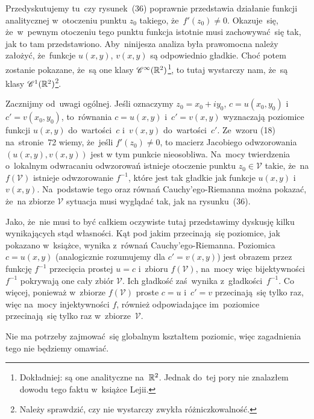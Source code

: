 \documentclass[a4paper,11pt]{article}
\begin{document}
\vspace{\spaceFour}


\start {} Przedyskutujemy tu~czy rysunek~(36) poprawnie
przedstawia działanie funkcji analitycznej w~otoczeniu punktu
$z_{ 0 }$ takiego, że~$f'( z_{ 0 } ) \neq 0$. Okazuje~się, że~w~pewnym
otoczeniu tego punktu funkcja istotnie musi zachowywać~się tak, jak to
tam przedstawiono. Aby~ninijesza analiza była prawomocna należy
założyć, że~funkcje $u( x, y )$, $v( x, y )$ są odpowiednio gładkie.
Choć potem zostanie pokazane, że~są one klasy
$\mathcal{C}^{ \infty }( \mathbb{R}^{ 2 } )$\footnote{Dokładniej: są one analityczne na~$\mathbb{R}^{ 2 }$.
  Jednak do~tej pory nie znalazłem dowodu tego faktu w~książce
  Lejii.}, to tutaj wystarczy nam, że~są klasy
$\mathcal{C}^{ 1 }( \mathbb{R}^{ 2 } )$\footnote{Należy sprawdzić, czy nie wystarczy zwykła
  różniczkowalność.}.

Zacznijmy od~uwagi ogólnej. Jeśli oznaczymy
$z_{ 0 } = x_{ 0 } + i y_{ 0 }$, $c = u( x_{ 0 }, y_{ 0 } )$
i~$c' = v( x_{ 0 }, y_{ 0 } )$, to~równania $c = u( x, y )$
i~$c' = v( x, y )$ wyznaczają poziomice funkcji $u( x, y )$
do~wartości~$c$ i~$v( x, y )$ do~wartości~$c'$. Ze~wzoru (18)
na~stronie~72 wiemy, że~jeśli $f'( z_{ 0 } ) \neq 0$, to macierz
Jacobiego odwzorowania $( u( x, y ), v( x, y ) )$ jest w tym punkcie
nieosobliwa. Na~mocy twierdzenia o~lokalnym odwracaniu odwzorowań
istnieje otoczenie punktu $z_{ 0 } \in \mathcal{V}$ takie, że~na
$f( \mathcal{V} )$ istnieje odwzorowanie $f^{ -1 }$, które jest tak
gładkie jak funkcje $u( x, y )$ i~$v( x, y )$. Na~podstawie tego oraz
równań Cauchy'ego-Riemanna można pokazać, że~na zbiorze $\mathcal{V}$
sytuacja musi wyglądać tak, jak na rysunku~(36).

Jako, że~nie musi to być całkiem oczywiste tutaj przedstawimy dyskusję
kilku wynikających stąd własności. Kąt pod jakim przecinają~się
poziomice, jak pokazano w~książce, wynika z~równań
Cauchy'ego-Riemanna. Poziomica $c = u( x, y )$ (analogicznie
rozumujemy dla $c' = v( x, y )$) jest obrazem przez funkcję $f^{ -1 }$
przecięcia prostej $u = c$ i~zbioru $f( \mathcal{V} )$, na~mocy więc
bijektywności~$f^{ -1 }$ pokrywają one cały zbiór $\mathcal{V}$. Ich
gładkość zaś~wynika z~gładkości~$f^{ -1 }$. Co więcej, ponieważ
w~zbiorze $f( \mathcal{V} )$ proste $c = u$ i~$c' = v$ przecinają~się
tylko raz, więc na~mocy injektywności $f$, również odpowiadające
im~poziomice przecinają~się tylko raz w~zbiorze~$\mathcal{V}$.

Nie ma potrzeby zajmować~się globalnym kształtem poziomic, więc
zagadnienia tego nie będziemy omawiać.
\end{document}
